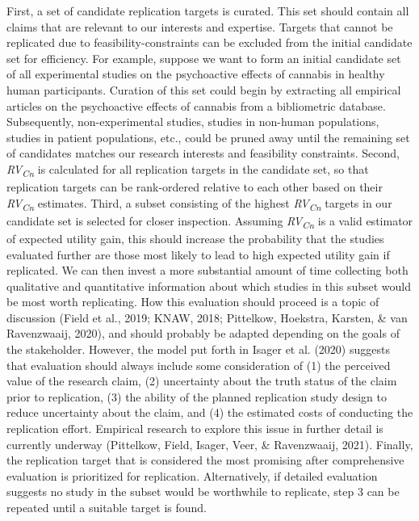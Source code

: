 \documentclass[
  english,
  man,floatsintext]{apa6}
\begin{document}
First, a set of candidate replication targets is curated. This set should contain all claims that are relevant to our interests and expertise. Targets that cannot be replicated due to feasibility-constraints can be excluded from the initial candidate set for efficiency. For example, suppose we want to form an initial candidate set of all experimental studies on the psychoactive effects of cannabis in healthy human participants. Curation of this set could begin by extracting all empirical articles on the psychoactive effects of cannabis from a bibliometric database. Subsequently, non-experimental studies, studies in non-human populations, studies in patient populations, etc., could be pruned away until the remaining set of candidates matches our research interests and feasibility constraints. Second, \emph{RV\textsubscript{Cn}} is calculated for all replication targets in the candidate set, so that replication targets can be rank-ordered relative to each other based on their \emph{RV\textsubscript{Cn}} estimates. Third, a subset consisting of the highest \emph{RV\textsubscript{Cn}} targets in our candidate set is selected for closer inspection. Assuming \emph{RV\textsubscript{Cn}} is a valid estimator of expected utility gain, this should increase the probability that the studies evaluated further are those most likely to lead to high expected utility gain if replicated. We can then invest a more substantial amount of time collecting both qualitative and quantitative information about which studies in this subset would be most worth replicating. How this evaluation should proceed is a topic of discussion (Field et al., 2019; KNAW, 2018; Pittelkow, Hoekstra, Karsten, \& van Ravenzwaaij, 2020), and should probably be adapted depending on the goals of the stakeholder. However, the model put forth in Isager et al. (2020) suggests that evaluation should always include some consideration of (1) the perceived value of the research claim, (2) uncertainty about the truth status of the claim prior to replication, (3) the ability of the planned replication study design to reduce uncertainty about the claim, and (4) the estimated costs of conducting the replication effort. Empirical research to explore this issue in further detail is currently underway (Pittelkow, Field, Isager, Veer, \& Ravenzwaaij, 2021). Finally, the replication target that is considered the most promising after comprehensive evaluation is prioritized for replication. Alternatively, if detailed evaluation suggests no study in the subset would be worthwhile to replicate, step 3 can be repeated until a suitable target is found.
\end{document}
